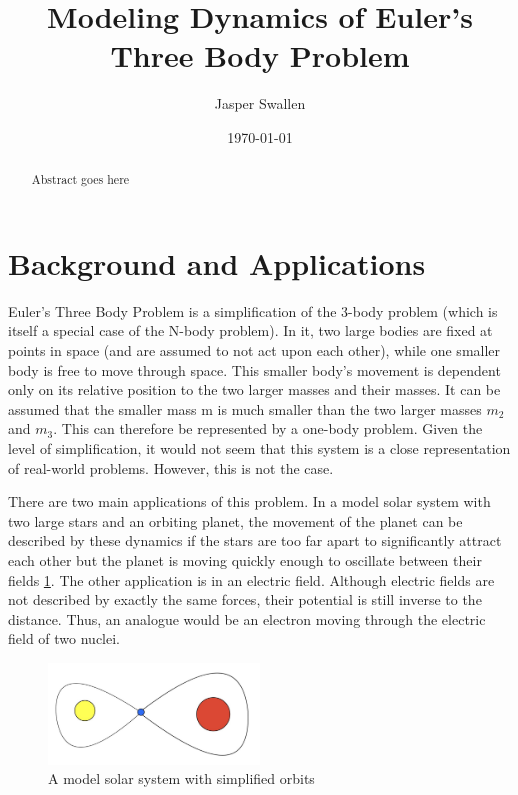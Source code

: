 \documentclass[preprint,titlepage,preprintnumbers,amsmath,amssymb,aps,11pt]{revtex4-2}
\begin{document}
\title{Modeling Dynamics of Euler's Three Body Problem}
\author{Jasper Swallen}
\date{\today}


\begin{abstract}
    Abstract goes here
    {\singlespacing \tableofcontents}
\end{abstract}

\maketitle


\section{Background and Applications}
Euler's Three Body Problem is a simplification of the 3-body problem (which is itself a special case of the N-body problem). In it, two large bodies are fixed at points in space (and are assumed to not act upon each other), while one smaller body is free to move through space. This smaller body's movement is dependent only on its relative position to the two larger masses and their masses. It can be assumed that the smaller mass m is much smaller than the two larger masses $m_2$ and $m_3$. This can therefore be represented by a one-body problem. Given the level of simplification, it would not seem that this system is a close representation of real-world problems. However, this is not the case.

There are two main applications of this problem. In a model solar system with two large stars and an orbiting planet, the movement of the planet can be described by these dynamics if the stars are too far apart to significantly attract each other but the planet is moving quickly enough to oscillate between their fields \ref{fig:orbit}. The other application is in an electric field. Although electric fields are not described by exactly the same forces, their potential is still inverse to the distance. Thus, an analogue would be an electron moving through the electric field of two nuclei.

\begin{figure}
    \centering
    \includegraphics[width=0.5\textwidth]{Fig 1.jpeg}
    \caption{A model solar system with simplified orbits}
    \label{fig:orbit}
\end{figure}
\end{document}
